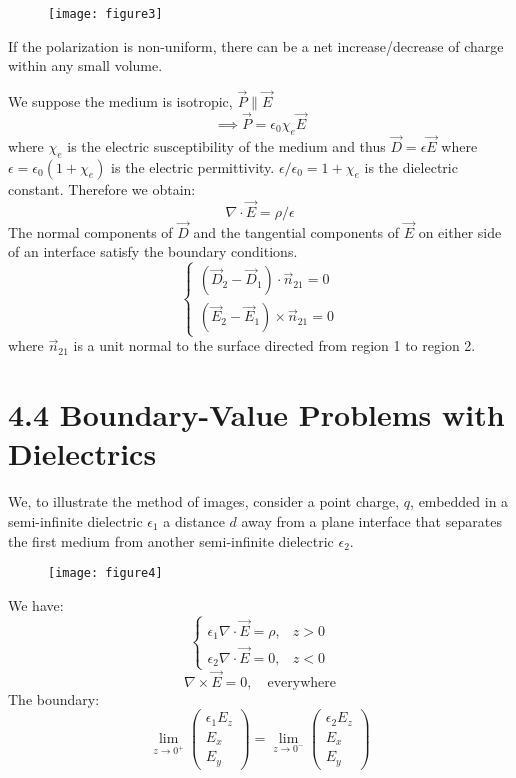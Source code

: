 \documentclass{article}
\begin{document}
	\begin{figure}[h]
		\centering
		\texttt{[image: figure3]}
		\caption{}
		\label{fig:figure3}
	\end{figure}
	
	If the polarization is non-uniform, there can be a net increase/decrease of charge within any small volume.
	
	We suppose the medium is isotropic, $\vec{P} \parallel \vec{E}$
	\[
	\implies \vec{P} = \epsilon_0 \chi_e \vec{E}
	\]
	where $\chi_e$ is the electric susceptibility of the medium and thus $\vec{D} = \epsilon \vec{E}$
	where $\epsilon = \epsilon_0(1+\chi_e)$ is the electric permittivity. $\epsilon/\epsilon_0 = 1+\chi_e$ is the dielectric constant.
	Therefore we obtain:
	\[
	\nabla \cdot \vec{E} = \rho/\epsilon
	\]
	The normal components of $\vec{D}$ and the tangential components of $\vec{E}$ on either side of an interface satisfy the boundary conditions.
	\[
	\begin{cases}
		(\vec{D}_2 - \vec{D}_1) \cdot \vec{n}_{21} = 0 \\
		(\vec{E}_2 - \vec{E}_1) \times \vec{n}_{21} = 0
	\end{cases}
	\]
	where $\vec{n}_{21}$ is a unit normal to the surface directed from region 1 to region 2.
	
	\section*{4.4 Boundary-Value Problems with Dielectrics}
	
	We, to illustrate the method of images, consider a point charge, $q$, embedded in a semi-infinite dielectric $\epsilon_1$ a distance $d$ away from a plane interface that separates the first medium from another semi-infinite dielectric $\epsilon_2$.
	
	\begin{figure}[h]
		\centering
		\texttt{[image: figure4]}
		\caption{}
		\label{fig:figure4}
	\end{figure}
	
	We have:
	\[
	\begin{cases}
		\epsilon_1 \nabla \cdot \vec{E} = \rho, & z>0 \\
		\epsilon_2 \nabla \cdot \vec{E} = 0, & z<0
	\end{cases}
	\]
	\[
	\nabla \times \vec{E} = 0, \quad \text{everywhere}
	\]
	The boundary:
	\[
	\lim_{z \to 0^+} \begin{pmatrix} \epsilon_1 E_z \\ E_x \\ E_y \end{pmatrix} = \lim_{z \to 0^-} \begin{pmatrix} \epsilon_2 E_z \\ E_x \\ E_y \end{pmatrix}
	\]
	
\end{document}
